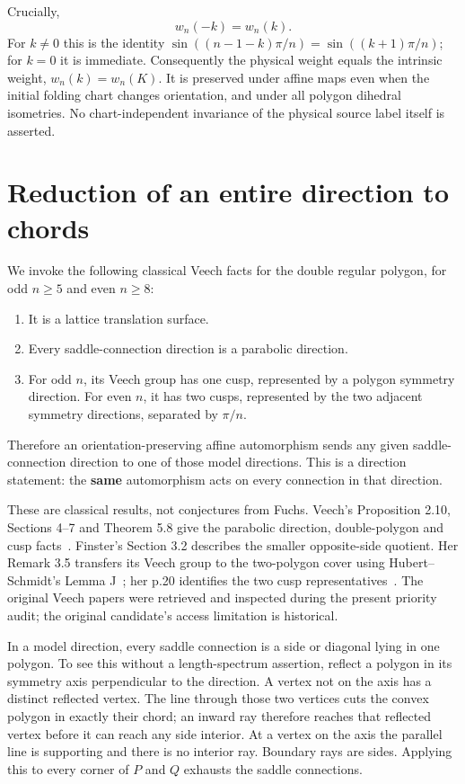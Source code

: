 \documentclass[11pt]{article}
\begin{document}
Crucially,
\[
w_n(-k)=w_n(k).
\tag{10}
\]
For \(k\ne0\) this is the identity
\(\sin((n-1-k)\pi/n)=\sin((k+1)\pi/n)\); for \(k=0\) it is immediate. Consequently the physical weight equals the intrinsic weight, \(w_n(k)=w_n(K)\). It is preserved under affine maps even when the initial folding chart changes orientation, and under all polygon dihedral isometries. No chart-independent invariance of the physical source label itself is asserted.

\section{Reduction of an entire direction to chords}

We invoke the following classical Veech facts for the double regular polygon, for odd \(n\ge5\) and even \(n\ge8\):

\begin{enumerate}
\item It is a lattice translation surface.
\item Every saddle-connection direction is a parabolic direction.
\item For odd \(n\), its Veech group has one cusp, represented by a polygon symmetry direction. For even \(n\), it has two cusps, represented by the two adjacent symmetry directions, separated by \(\pi/n\).

\end{enumerate}
Therefore an orientation-preserving affine automorphism sends any given saddle-connection direction to one of those model directions. This is a direction statement: the \textbf{same} automorphism acts on every connection in that direction.

These are classical results, not conjectures from Fuchs. Veech's Proposition 2.10, Sections 4--7 and Theorem 5.8 give the parabolic direction, double-polygon and cusp facts~\cite{Veech}. Finster's Section 3.2 describes the smaller opposite-side quotient. Her Remark 3.5 transfers its Veech group to the two-polygon cover using Hubert--Schmidt's Lemma J~\cite{HubertSchmidt}; her p.20 identifies the two cusp representatives~\cite{Finster}. The original Veech papers were retrieved and inspected during the present priority audit; the original candidate's access limitation is historical.

In a model direction, every saddle connection is a side or diagonal lying in one polygon. To see this without a length-spectrum assertion, reflect a polygon in its symmetry axis perpendicular to the direction. A vertex not on the axis has a distinct reflected vertex. The line through those two vertices cuts the convex polygon in exactly their chord; an inward ray therefore reaches that reflected vertex before it can reach any side interior. At a vertex on the axis the parallel line is supporting and there is no interior ray. Boundary rays are sides. Applying this to every corner of \(P\) and \(Q\) exhausts the saddle connections.
\end{document}
